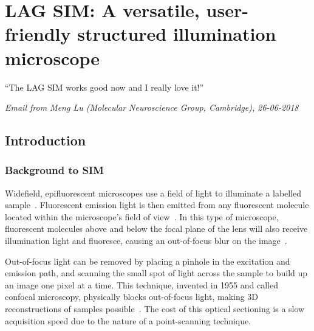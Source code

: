 \chapter{LAG SIM: A versatile, user-friendly structured illumination microscope} \label{chap:LAGSIM}



\ifpdf
    \graphicspath{{Chapter2/Figs/Raster/}{Chapter2/Figs/PDF/}{Chapter2/Figs/}}
\else
    \graphicspath{{Chapter2/Figs/Vector/}{Chapter2/Figs/}}
\fi

``The LAG SIM works good now and I really love it!''

\textit{Email from Meng Lu (Molecular Neuroscience Group, Cambridge), 26-06-2018}

\section{Introduction} \label{sec:simintro}
\subsection{Background to SIM}
Widefield, epifluorescent microscopes use a field of light to illuminate a labelled sample~\cite[\textit{ch. 2}]{lakowicz2007principles}. 
Fluorescent emission light is then emitted from any fluorescent molecule located within the microscope's field of view~\cite{pawley2012handbook}. 
In this type of microscope, fluorescent molecules above and below the focal plane of the lens will also receive illumination light and fluoresce, causing an out-of-focus blur on the image~\cite{wilson1984theory}.

Out-of-focus light can be removed by placing a pinhole in the excitation and emission path, and scanning the small spot of light across the sample to build up an image one pixel at a time. 
This technique, invented in 1955 and called confocal microscopy, physically blocks out-of-focus light, making 3D reconstructions of samples possible~\cite{marvin1961microscopy}. 
The cost of this optical sectioning is a slow acquisition speed due to the nature of a point-scanning technique. 


